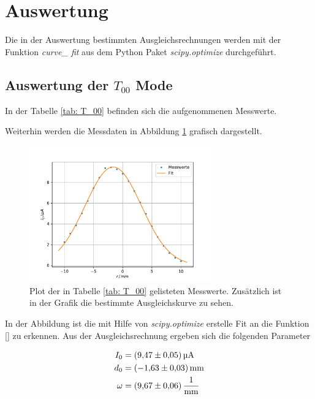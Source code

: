 \section{Auswertung}

Die in der Auswertung bestimmten Ausgleichsrechnungen werden mit
der Funktion \emph{curve\_ fit} \cite{scipy} aus dem Python Paket \emph{scipy.optimize}\cite{scipy} durchgeführt. %

\subsection{Auswertung der $T_{00}$ Mode}
\FloatBarrier
In der Tabelle \ref{tab: T_00} befinden sich die aufgenommenen Messwerte.

Weiterhin werden die Messdaten in Abbildung \ref{fig: T_00} grafisch dargestellt.
\begin{figure}[h!]
  \centering
  \includegraphics[width=0.7\textwidth]{../Messdaten/plots/T_00.pdf}
  \caption{Plot der in Tabelle \ref{tab: T_00} gelisteten Messwerte. Zusätzlich ist in der Grafik die bestimmte Ausgleichskurve zu sehen.}
  \label{fig: T_00}
\end{figure}
In der Abbildung ist die mit Hilfe von \emph{scipy.optimize} erstelle Fit an die Funktion \eqref{} zu erkennen. %
Aus der Ausgleichsrechnung ergeben sich die folgenden Parameter

\begin{align}
  \label{eq: fit_t_00}
  \begin{aligned}
  I_0&=\SI{9.47 \pm 0.05}{\micro\ampere}\\
  d_0&=\SI{-1.63\pm 0.03}{\milli\meter}\\
  \omega&=\SI{9.67\pm0.06}{\per\milli\meter}
\end{aligned}
\end{align}
\FloatBarrier
